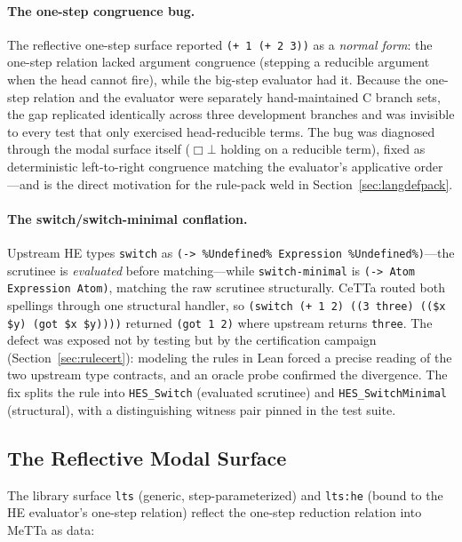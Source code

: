 \documentclass[11pt]{article}
\newcommand{\code}[1]{\texttt{#1}}
\newcommand{\HE}{\textup{HE}}
\newcommand{\CeTTa}{\textup{CeTTa}}
\begin{document}
\paragraph{The one-step congruence bug.}  The reflective one-step
surface reported \code{(+ 1 (+ 2 3))} as a \emph{normal form}: the
one-step relation lacked argument congruence (stepping a reducible
argument when the head cannot fire), while the big-step evaluator had
it.  Because the one-step relation and the evaluator were separately
hand-maintained C branch sets, the gap replicated identically across
three development branches and was invisible to every test that only
exercised head-reducible terms.  The bug was diagnosed through the
modal surface itself ($\Box\bot$ holding on a reducible term), fixed
as deterministic left-to-right congruence matching the evaluator's
applicative order---and is the direct motivation for the rule-pack
weld in Section~\ref{sec:langdefpack}.

\paragraph{The switch/switch-minimal conflation.}  Upstream \HE{}
types \code{switch} as \code{(-> \%Undefined\% Expression
\%Undefined\%)}---the scrutinee is \emph{evaluated} before
matching---while \code{switch-minimal} is \code{(-> Atom Expression
Atom)}, matching the raw scrutinee structurally.  \CeTTa{} routed both
spellings through one structural handler, so
\code{(switch (+ 1 2) ((3 three) ((\$x \$y) (got \$x \$y))))} returned
\code{(got 1 2)} where upstream returns \code{three}.  The defect was
exposed not by testing but by the certification campaign
(Section~\ref{sec:rulecert}): modeling the rules in Lean forced a
precise reading of the two upstream type contracts, and an oracle
probe confirmed the divergence.  The fix splits the rule into
\code{HES\_Switch} (evaluated scrutinee) and \code{HES\_SwitchMinimal}
(structural), with a distinguishing witness pair pinned in the test
suite.

\subsection{The Reflective Modal Surface}
\label{sec:modal}

The library surface \code{lts} (generic, step-parameterized) and
\code{lts:he} (bound to the \HE{} evaluator's one-step relation) reflect the
one-step reduction relation into MeTTa as data:
\end{document}
